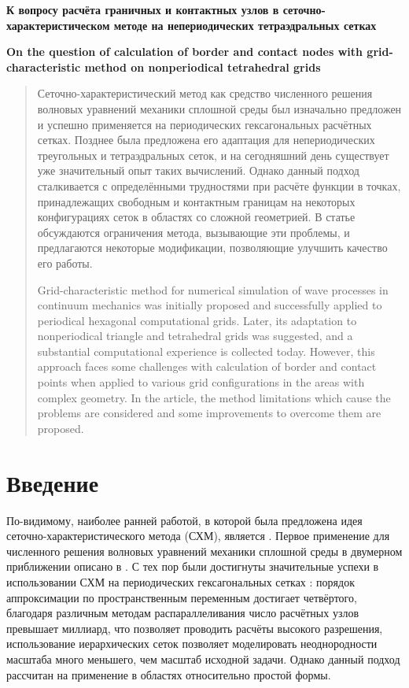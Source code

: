 \documentclass[a4paper]{article}
\numberwithin{equation}{section}
\begin{document}
\begin{center}
	\Large\textbf{{{К вопросу расчёта граничных и контактных узлов 
	в сеточно-характеристическом методе на непериодических тетраэдральных сетках}}}
	
	\Large\textbf{{{On the question of calculation of border and contact nodes with  
	grid-characteristic method on nonperiodical tetrahedral grids}}}
\end{center}

\begin{abstract}
Сеточно-характеристический метод как средство численного решения волновых уравнений 
механики сплошной среды был изначально предложен и успешно применяется на периодических 
гексагональных расчётных сетках. 
Позднее была предложена его адаптация для 
непериодических треугольных и тетраэдральных сеток, 
и на сегодняшний день существует уже значительный опыт таких вычислений. 
Однако данный подход сталкивается с определёнными трудностями 
при расчёте функции в точках, принадлежащих свободным и контактным границам 
на некоторых конфигурациях сеток в областях со сложной геометрией. 
В статье обсуждаются ограничения метода, вызывающие эти проблемы, и 
предлагаются некоторые модификации, позволяющие улучшить качество его работы. 

Grid-characteristic method for numerical simulation of wave processes in continuum 
mechanics was initially proposed and successfully applied to periodical hexagonal 
computational grids. 
Later, its adaptation to nonperiodical triangle and tetrahedral grids 
was suggested, and a substantial computational experience is collected today. 
However, this approach faces some challenges 
with calculation of border and contact points 
when applied to various grid configurations in the areas with complex geometry. 
In the article, the method limitations which cause the problems are considered 
and some improvements to overcome them are proposed. 
\end{abstract}


\section{Введение}
По-видимому, наиболее ранней работой, в которой была предложена идея 
сеточно-характери\-стического метода (СХМ), является \cite{magomedov_kholodov_1969}. 
Первое применение для численного решения волновых уравнений 
механики сплошной среды в двумерном приближении описано в \cite{petrov_kholodov}. 
С тех пор были достигнуты значительные успехи в использовании СХМ на периодических 
гексагональных сетках \cite{golubev_khokhlov_15, golubev_khokhlov_16, gcm_for_seismic}: 
порядок аппроксимации по пространственным переменным достигает четвёртого, 
благодаря различным методам распараллеливания число расчётных узлов превышает 
миллиард, что позволяет проводить расчёты высокого разрешения, использование 
иерархических сеток позволяет моделировать неоднородности масштаба много меньшего, 
чем масштаб исходной задачи. Однако данный подход рассчитан на применение 
в областях относительно простой формы. 
\end{document}
